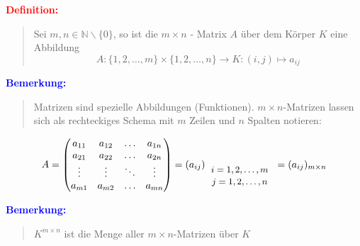 \documentclass{article}
\newcommand{\red}[1]{\textcolor{red}{#1}}
\newcommand{\blue}[1]{\textcolor{blue}{#1}}
\newcommand{\de}[1]{\red{\textbf{Definition: }}\begin{quote}#1\end{quote}}
\newcommand{\an}[1]{\blue{\textbf{Bemerkung: }}\begin{quote}#1\end{quote}}
\newcommand{\N}{\mathbb{N}}
\begin{document}
\de{Sei $m, n \in \N \backslash \{0\}$, so ist die $m \times n$ - Matrix $A$ über dem Körper $K$ eine Abbildung
\begin{equation*}
    A: \{1, 2, \dots, m\} \times \{1, 2, \dots, n\} \rightarrow K: (i, j) \mapsto a_{ij}
\end{equation*}}

\newpage

\an{Matrizen sind spezielle Abbildungen (Funktionen). $m \times n$-Matrizen lassen sich als rechteckiges Schema mit $m$ Zeilen und $n$ Spalten notieren:}
\begin{equation*}
    A = 
    \begin{pmatrix}
        a_{11} & a_{12} & \dots & a_{1n} \\
        a_{21} & a_{22} & \dots & a_{2n} \\
        \vdots & \vdots & \ddots & \vdots \\
        a_{m1} & a_{m2} & \dots & a_{mn}
    \end{pmatrix}
    = (a_{ij})_{
       \begin{tabular}{c}
            \small $i = 1, 2, \dots, m$ \\
            \small $j = 1, 2, \dots, n$
            
        \end{tabular}
    }
    = (a_{ij})_{m \times n}
\end{equation*}

\an{$K^{m \times n}$ ist die Menge aller $m \times n$-Matrizen über $K$}
\end{document}
